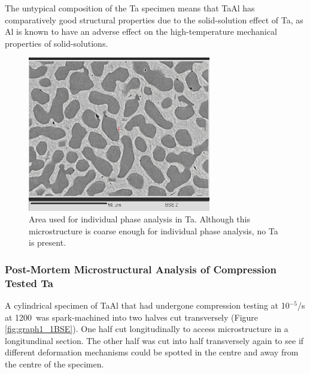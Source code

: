 The untypical composition of  the Ta specimen means that TaAl has comparatively good structural properties due to the solid-solution effect of Ta, as Al is known to have an adverse effect on the high-temperature mechanical properties of solid-solutions.  

%
\begin{figure}[htbp]
\begin{center}
\includegraphics[width=8cm]{CrVTaRFi}
\caption{Area used for individual phase analysis in Ta.  Although this microstructure is coarse enough for individual phase analysis, no Ta is present.}\label{fig:sanTaRFi}
\end{center}
\end{figure}
% 


%
\subsubsection{Post-Mortem Microstructural Analysis of Compression Tested Ta}

A cylindrical specimen of TaAl that had undergone compression testing at 10$^{-5}$/s at 1200\celsius\ was spark-machined into two halves cut transversely (Figure \ref{fig:graph1_1BSE}).  One half cut longitudinally to access microstructure in a longitundinal section.  The other half was cut into half transversely again to see if different deformation mechanisms could be spotted in the centre and away from the centre of the specimen.

